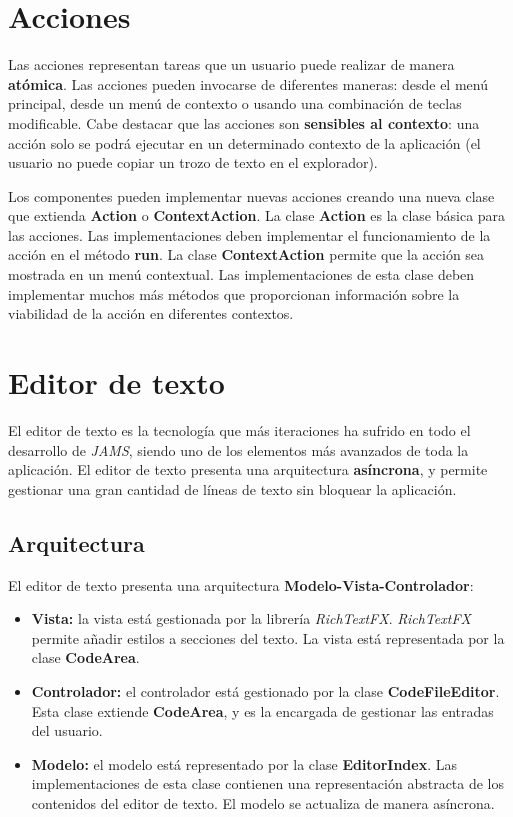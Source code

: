 \section{Acciones}\label{sec:acciones}

Las acciones representan tareas que un usuario puede realizar de manera
\textbf{atómica}.
Las acciones pueden invocarse de diferentes maneras:
desde el menú principal, desde un menú de contexto
o usando una combinación de teclas modificable.
Cabe destacar que las acciones son \textbf{sensibles al contexto}:
una acción solo se podrá ejecutar en un determinado contexto
de la aplicación (el usuario no puede copiar un trozo de texto
en el explorador).

\noindent Los componentes pueden implementar nuevas acciones
creando una nueva clase que extienda \textbf{Action} o
\textbf{ContextAction}.
La clase \textbf{Action} es la clase básica para las acciones.
Las implementaciones deben implementar el funcionamiento
de la acción en el método \textbf{run}.
La clase \textbf{ContextAction} permite que la acción sea
mostrada en un menú contextual.
Las implementaciones de esta clase deben implementar
muchos más métodos que proporcionan información
sobre la viabilidad de la acción en diferentes contextos.


\section{Editor de texto}\label{sec:editor-de-texto}

El editor de texto es la tecnología que más iteraciones
ha sufrido en todo el desarrollo de \textit{JAMS},
siendo uno de los elementos más avanzados de toda
la aplicación.
El editor de texto presenta una arquitectura
\textbf{asíncrona}, y permite gestionar una gran
cantidad de líneas de texto sin bloquear la aplicación.

\subsection{Arquitectura}\label{subsec:arquitectura}

El editor de texto presenta una arquitectura
\textbf{Modelo-Vista-Controlador}:
\begin{itemize}
    \item \textbf{Vista:} la vista está gestionada
    por la librería \textit{RichTextFX}\cite{RICH_TEXT_FX}.
    \textit{RichTextFX} permite añadir estilos
    a secciones del texto.
    La vista está representada por la clase
    \textbf{CodeArea}.
    \item \textbf{Controlador:} el controlador está
    gestionado por la clase \textbf{CodeFileEditor}.
    Esta clase extiende \textbf{CodeArea}, y es la
    encargada de gestionar las entradas del usuario.
    \item \textbf{Modelo:} el modelo está representado
    por la clase \textbf{EditorIndex}.
    Las implementaciones de esta clase contienen
    una representación abstracta de los contenidos
    del editor de texto.
    El modelo se actualiza de manera asíncrona.
\end{itemize}

